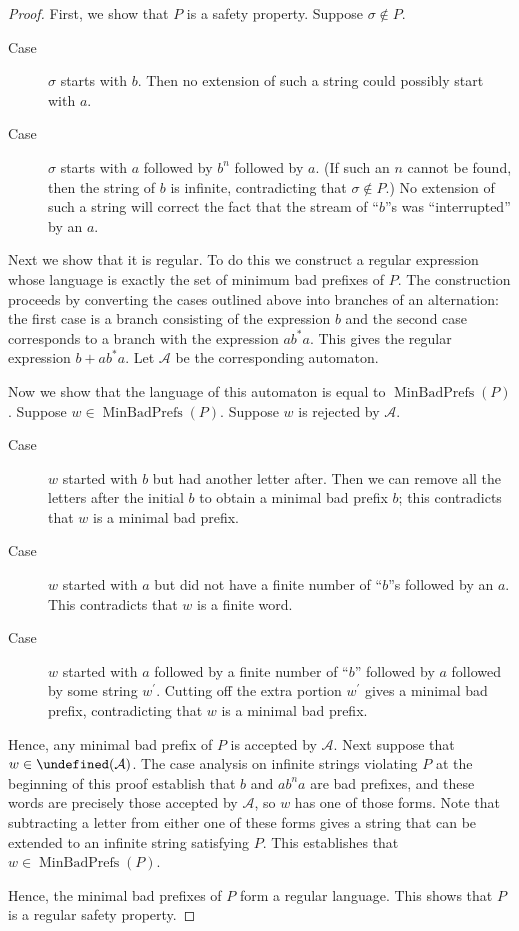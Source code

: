 \documentclass[letterpaper,11pt]{article}
\DeclareMathOperator{\MBP}{MinBadPrefs}
\let\L\undefined
\DeclareMathOperator{\L}{\mathcal{L}}
\begin{document}
\begin{proof}
    First, we show that $P$ is a safety property.
    Suppose $\sigma \notin P$.
    \begin{description}
        \item[Case] $\sigma$ starts with $b$. Then no extension of such a
            string could possibly start with $a$.
        \item[Case] $\sigma$ starts with $a$ followed by $b^n$ followed by $a$.
            (If such an $n$ cannot be found, then the string of $b$ is
            infinite, contradicting that $\sigma \notin P$.)
            No extension of such a string will correct the fact that the stream
            of ``$b$''s was ``interrupted'' by an $a$.
    \end{description}

    Next we show that it is regular. To do this we construct a regular
    expression whose language is exactly the set of minimum bad prefixes of
    $P$. The construction proceeds by converting the cases outlined above into
    branches of an alternation: the first case is a branch consisting of the
    expression $b$ and the second case corresponds to a branch with the
    expression $a b^* a$. This gives the regular expression $b + a b^* a$. Let
    $\mathcal{A}$ be the corresponding automaton.

    Now we show that the language of this automaton is equal to $\MBP(P)$.
    Suppose $w \in \MBP(P)$. Suppose $w$ is rejected by $\mathcal{A}$.
    \begin{description}
        \item[Case] $w$ started with $b$ but had another letter after. Then we
            can remove all the letters after the initial $b$ to obtain a
            minimal bad prefix $b$; this contradicts that $w$ is a minimal bad
            prefix.
        \item[Case] $w$ started with $a$ but did not have a finite number of
            ``$b$''s followed by an $a$. This contradicts that $w$ is a finite
            word.
        \item[Case] $w$ started with $a$ followed by a finite number of ``$b$''
            followed by $a$ followed by some string $w^\prime$. Cutting off the
            extra portion $w^\prime$ gives a minimal bad prefix, contradicting
            that $w$ is a minimal bad prefix.
    \end{description}
    Hence, any minimal bad prefix of $P$ is accepted by $\mathcal{A}$. Next
    suppose that $w \in \L(\mathcal{A})$. The case analysis on infinite strings
    violating $P$ at the beginning of this proof establish that $b$ and
    $a b^n a$ are bad prefixes, and these words are precisely those accepted by
    $\mathcal{A}$, so $w$ has one of those forms. Note that subtracting a
    letter from either one of these forms gives a string that can be extended
    to an infinite string satisfying $P$. This establishes that
    $w \in \MBP(P)$.

    Hence, the minimal bad prefixes of $P$ form a regular language. This shows
    that $P$ is a regular safety property.
\end{proof}
\end{document}
